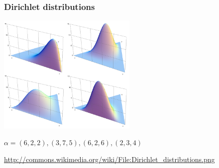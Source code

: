 \documentclass[t]{beamer}
\begin{document}
\begin{frame}
\frametitle{Dirichlet distributions}
\includegraphics[width=0.5\textwidth]{img/dirichlet.png}

$\alpha = (6,2,2), (3,7,5), (6,2,6), (2,3,4)$

\url{http://commons.wikimedia.org/wiki/File:Dirichlet\_distributions.png}
\end{frame}
%
%
%
%
%
%
%
%
%
%
%
%
%
\end{document}
